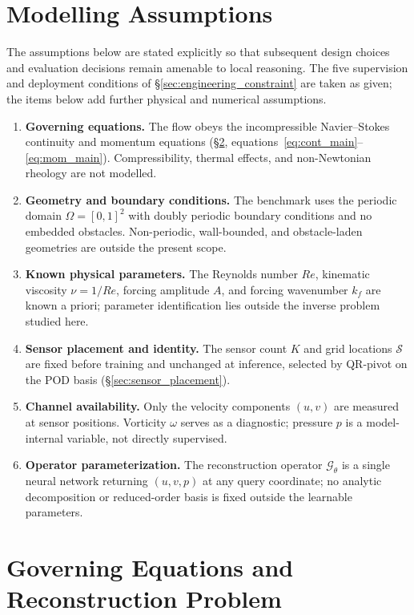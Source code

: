 \section{Modelling Assumptions}
\label{sec:assumptions}

The assumptions below are stated explicitly so that subsequent design choices and evaluation decisions remain amenable to local reasoning. The five supervision and deployment conditions of \S\ref{sec:engineering_constraint} are taken as given; the items below add further physical and numerical assumptions.

\begin{enumerate}
    \item \textbf{Governing equations.} The flow obeys the incompressible Navier--Stokes continuity and momentum equations (\S\ref{sec:problem_formulation}, equations~\eqref{eq:cont_main}--\eqref{eq:mom_main}). Compressibility, thermal effects, and non-Newtonian rheology are not modelled.
    \item \textbf{Geometry and boundary conditions.} The benchmark uses the periodic domain $\Omega = [0,1]^2$ with doubly periodic boundary conditions and no embedded obstacles. Non-periodic, wall-bounded, and obstacle-laden geometries are outside the present scope.
    \item \textbf{Known physical parameters.} The Reynolds number $Re$, kinematic viscosity $\nu = 1/Re$, forcing amplitude $A$, and forcing wavenumber $k_f$ are known a priori; parameter identification lies outside the inverse problem studied here.
    \item \textbf{Sensor placement and identity.} The sensor count $K$ and grid locations $\mathcal{S}$ are fixed before training and unchanged at inference, selected by QR-pivot on the POD basis (\S\ref{sec:sensor_placement}).
    \item \textbf{Channel availability.} Only the velocity components $(u, v)$ are measured at sensor positions. Vorticity $\omega$ serves as a diagnostic; pressure $p$ is a model-internal variable, not directly supervised.
    \item \textbf{Operator parameterization.} The reconstruction operator $\mathcal{G}_\theta$ is a single neural network returning $(u, v, p)$ at any query coordinate; no analytic decomposition or reduced-order basis is fixed outside the learnable parameters.
\end{enumerate}

\section{Governing Equations and Reconstruction Problem}
\label{sec:problem_formulation}

